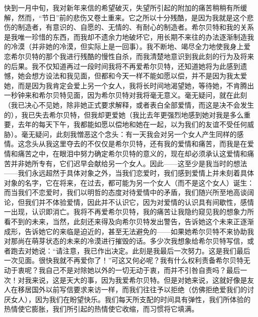 \par 快到一月中旬，我对新年来信的希望破灭，失望所引起的附加的痛苦稍稍有所缓解，然而，“节日”前的悲伤又卷土重来。它之所以十分残酷，是因为我就是这个悲伤的制造者，有意识的、自愿的、无情的、有耐心的制造者。希尔贝特和我的关系是我唯一珍惜的东西，而我却不遗余力地破坏它，用长期不来往的办法逐渐制造我的冷漠（并非她的冷漠，但实际上是一回事）。我不断地、竭尽全力地使我身上爱恋希尔贝特的那个我进行残酷的慢性自杀，而我清楚地意识到我此刻的行为及将来的后果。我不仅知道再过一段时间我将不再爱希尔贝特，还知道她将为此感到遗憾，她会想方设法和我见面，但都和今天一样不能如愿以偿，并不是因为我太爱她，而是因为我肯定会爱上另一个女人，我将长时间地渴望她，等待她，不肯腾出一秒钟来和希尔贝特见面，因为希尔贝特对我将毫无意义。毫无疑问，就在此刻（我已决心不见她，除非她正式要求解释，或者表白全部爱情，而这是决不会发生的），我已失去希尔贝特，但我却更爱她（我比去年更强烈地感到她对我是多么重要，去年的每天下午，我都能如愿以偿地和她在一起，以为我们的友谊不受任何威胁）。毫无疑问，此刻我憎恶这个念头：有一天我会对另一个女人产生同样的感情。这念头从我这里夺去的不仅仅是希尔贝特，还有我的爱情和痛苦，而我是在爱情和痛苦之中，在眼泪中努力确定希尔贝特的意义的，现在却必须承认这爱情和痛苦并非她所专有，它们迟早会献给另一个女人。因此——这至少是我当时的想法——我们永远超然于具体对象之外，当我们恋爱时，我们感到爱情上并未刻着具体对象的名字，它在将来，在过去，都可能为另一个女人（而不是这个女人）诞生：而当我们不恋爱时，我们以明哲的态度对待爱情中的矛盾，我们随兴所至地高谈阔论，但我们并不体验爱情，因此并不认识它，因为对爱情的认识具有间歇性，感情一出现，认识即消亡。我将不再爱希尔贝特，我的痛苦让我隐约窥见我的想象力所看不到的未来，当然，此刻还来得及向希尔贝特发出警告，告诉她这个未来正逐渐成形，告诉她它的来临是迫近的，甚至无法避免的——如果她希尔贝特不来协助我对那尚在萌芽状态的未来的冷漠进行摧毁的话。多少次我想象给希尔贝特写信，或者跑去对她说：“请注意，我已作出决定。此刻是我最后一次努力。这是我们最后一次见面。很快我就不再爱你了！”可这又何必呢？我有什么权利责备希尔贝特无动于衷呢？我自己不是对除她以外的一切无动于衷，而并不引咎自责吗？最后一次！对我来说，这是天大的事，因为我爱希尔贝特。但是对她来说，这就好像是友人在移居国外以前写信要求来访一样，而我们往往予以拒绝（仿佛拒绝爱我们的讨厌女人），因为我们在盼望快乐。我们每天所支配的时间具有弹性，我们所体验的热情使它膨胀，我们所引起的热情使它收缩，而习惯将它填满。
